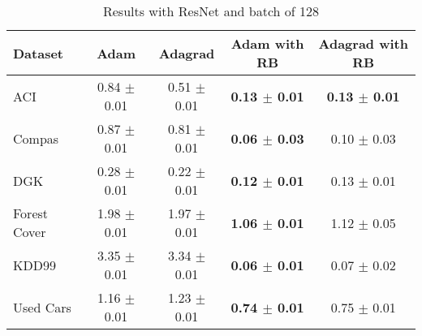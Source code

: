\begin{table}[hb!]%
  \caption{Results with ResNet and batch of 128}
  \label{tab:resultsRESNET128}
  \begin{footnotesize}
  \begin{center}
  \begin{tabular}{l|cccc}
    \toprule
    Dataset      & Adam         & Adagrad      & Adam with RB          & Adagrad with RB       \\
    \midrule                                                                                     
    ACI          & 0.84 $\pm$ 0.01 & 0.51 $\pm$ 0.01 & \textbf{0.13 $\pm$ 0.01} & \textbf{0.13 $\pm$ 0.01} \\
    Compas       & 0.87 $\pm$ 0.01 & 0.81 $\pm$ 0.01 & \textbf{0.06 $\pm$ 0.03} & 0.10 $\pm$ 0.03          \\
    DGK          & 0.28 $\pm$ 0.01 & 0.22 $\pm$ 0.01 & \textbf{0.12 $\pm$ 0.01} & 0.13 $\pm$ 0.01          \\
    Forest Cover & 1.98 $\pm$ 0.01 & 1.97 $\pm$ 0.01 & \textbf{1.06 $\pm$ 0.01} & 1.12 $\pm$ 0.05          \\
    KDD99        & 3.35 $\pm$ 0.01 & 3.34 $\pm$ 0.01 & \textbf{0.06 $\pm$ 0.01} & 0.07 $\pm$ 0.02          \\
    Used Cars    & 1.16 $\pm$ 0.01 & 1.23 $\pm$ 0.01 & \textbf{0.74 $\pm$ 0.01} & 0.75 $\pm$ 0.01          \\
  \bottomrule
\end{tabular}
\end{center}
\end{footnotesize}
\end{table}
